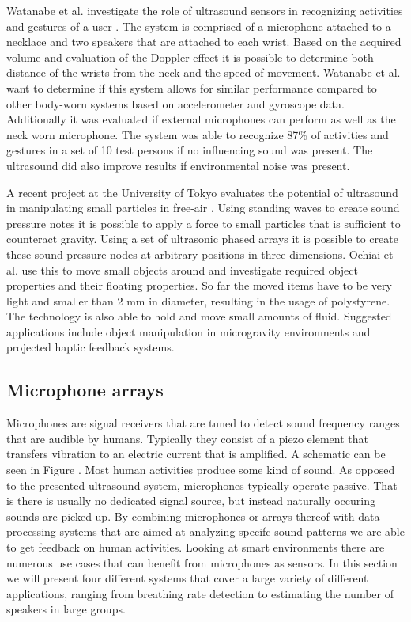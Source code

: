 Watanabe et al. investigate the role of ultrasound sensors in recognizing activities and gestures of a user \cite{watanabe2013ultrasound}. The system is comprised of a microphone attached to a necklace and two speakers that are attached to each wrist. Based on the acquired volume and evaluation of the Doppler effect it is possible to determine both distance of the wrists from the neck and the speed of movement. Watanabe et al. want to determine if this system allows for similar performance compared to other body-worn systems based on accelerometer and gyroscope data. Additionally it was evaluated if external microphones can perform as well as the neck worn microphone. The system was able to recognize 87\% of activities and gestures in a set of 10 test persons if no influencing sound was present. The ultrasound did also improve results if environmental noise was present.

A recent project at the University of Tokyo evaluates the potential of ultrasound in manipulating small particles in free-air \cite{ochiai2013three}. Using standing waves to  create sound pressure notes it is possible to apply a force to small particles that is sufficient to counteract gravity. Using a set of ultrasonic phased arrays it is possible to create these sound pressure nodes at arbitrary positions in three dimensions. Ochiai et al. use this to move small objects around and investigate required object properties and their floating properties. So far the moved items have to be very light and smaller than 2 mm in diameter, resulting in the usage of polystyrene. The technology is also able to hold and move small amounts of fluid. Suggested applications include object manipulation in microgravity environments and projected haptic feedback systems.

\subsection{Microphone arrays}
Microphones are signal receivers that are tuned to detect sound frequency ranges that are audible by humans. Typically they consist of a piezo element that transfers vibration to an electric current that is amplified. A schematic can be seen in Figure . Most human activities produce some kind of sound. As opposed to the presented ultrasound system, microphones typically operate passive. That is there is usually no dedicated signal source, but instead naturally occuring sounds are picked up. By combining microphones or arrays thereof with data processing systems that are aimed at analyzing specifc sound patterns we are able to get feedback on human activities. Looking at smart environments there are numerous use cases that can benefit from microphones as sensors. In this section we will present four different systems that cover a large variety of different applications, ranging from breathing rate detection to estimating the number of speakers in large groups.

